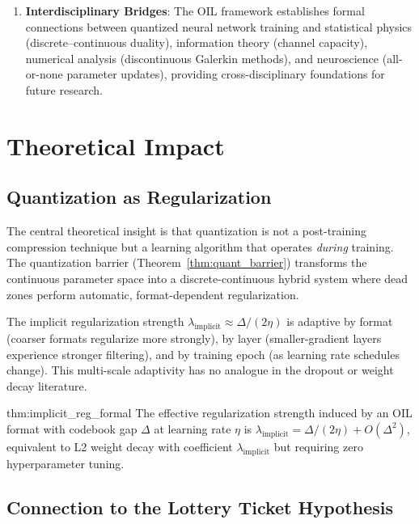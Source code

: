 \begin{enumerate}
    \item \textbf{Interdisciplinary Bridges}: The OIL framework establishes formal connections between quantized neural network training and statistical physics (discrete--continuous duality), information theory (channel capacity), numerical analysis (discontinuous Galerkin methods), and neuroscience (all-or-none parameter updates), providing cross-disciplinary foundations for future research.

\end{enumerate}

\section{Theoretical Impact}
\label{sec:theoretical_impact}

\subsection{Quantization as Regularization}

The central theoretical insight is that quantization is not a post-training compression technique but a learning algorithm that operates \textit{during} training. The quantization barrier (Theorem~\ref{thm:quant_barrier}) transforms the continuous parameter space into a discrete-continuous hybrid system where dead zones perform automatic, format-dependent regularization.

The implicit regularization strength $\lambda_{\text{implicit}} \approx \Delta / (2\eta)$ is adaptive by format (coarser formats regularize more strongly), by layer (smaller-gradient layers experience stronger filtering), and by training epoch (as learning rate schedules change). This multi-scale adaptivity has no analogue in the dropout or weight decay literature.

\begin{mythm}{thm:implicit_reg_formal}
The effective regularization strength induced by an OIL format with codebook gap $\Delta$ at learning rate $\eta$ is $\lambda_{\text{implicit}} = \Delta / (2\eta) + O(\Delta^2)$, equivalent to L2 weight decay with coefficient $\lambda_{\text{implicit}}$ but requiring zero hyperparameter tuning.
\end{mythm}

\subsection{Connection to the Lottery Ticket Hypothesis}

